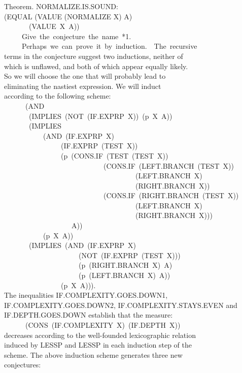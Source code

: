 \documentclass[10pt]{book}
\newenvironment{pubasis}{\begin{flushleft}}{\end{flushleft}}
\begin{document}
\begin{pubasis}
Theorem.  NORMALIZE.IS.SOUND:\\
(EQUAL (VALUE (NORMALIZE X) A)\\
~~~~~~~(VALUE~X~A))\\

~~~~~Give~the~conjecture~the~name~*1.\\

~~~~~Perhaps~we~can~prove~it~by~induction.~~The~recursive\\
terms in the conjecture suggest two inductions, neither of\\
which is unflawed, and both of which appear equally likely.\\
So we will choose the one that will probably lead to\\
eliminating the nastiest expression.  We will induct\\
according to the following scheme:\\
~~~~~~(AND\\
~~~~~~~(IMPLIES~(NOT~(IF.EXPRP~X))~(p~X~A))\\
~~~~~~~(IMPLIES\\
~~~~~~~~~~~(AND~(IF.EXPRP~X)\\
~~~~~~~~~~~~~~~~(IF.EXPRP~(TEST~X))\\
~~~~~~~~~~~~~~~~(p~(CONS.IF~(TEST~(TEST~X))\\
~~~~~~~~~~~~~~~~~~~~~~~~~~~~(CONS.IF~(LEFT.BRANCH~(TEST~X))\\
~~~~~~~~~~~~~~~~~~~~~~~~~~~~~~~~~~~~~(LEFT.BRANCH~X)\\
~~~~~~~~~~~~~~~~~~~~~~~~~~~~~~~~~~~~~(RIGHT.BRANCH~X))\\
~~~~~~~~~~~~~~~~~~~~~~~~~~~~(CONS.IF~(RIGHT.BRANCH~(TEST~X))\\
~~~~~~~~~~~~~~~~~~~~~~~~~~~~~~~~~~~~~(LEFT.BRANCH~X)\\
~~~~~~~~~~~~~~~~~~~~~~~~~~~~~~~~~~~~~(RIGHT.BRANCH~X)))\\
~~~~~~~~~~~~~~~~~~~A))\\
~~~~~~~~~~~(p~X~A))\\
~~~~~~~(IMPLIES~(AND~(IF.EXPRP~X)\\
~~~~~~~~~~~~~~~~~~~~~(NOT~(IF.EXPRP~(TEST~X)))\\
~~~~~~~~~~~~~~~~~~~~~(p~(RIGHT.BRANCH~X)~A)\\
~~~~~~~~~~~~~~~~~~~~~(p~(LEFT.BRANCH~X)~A))\\
~~~~~~~~~~~~~~~~(p~X~A))).\\
The inequalities IF.COMPLEXITY.GOES.DOWN1,\\
IF.COMPLEXITY.GOES.DOWN2, IF.COMPLEXITY.STAYS.EVEN and\\
IF.DEPTH.GOES.DOWN establish that the measure:\\
~~~~~~(CONS~(IF.COMPLEXITY~X)~(IF.DEPTH~X))\\
decreases according to the well-founded lexicographic relation\\
induced by LESSP and LESSP in each induction step of the\\
scheme.  The above induction scheme generates three new\\
conjectures:\\
\end{pubasis}
\end{document}
